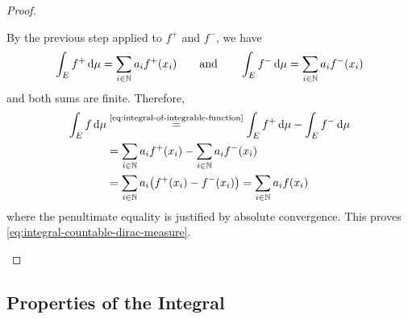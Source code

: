 \begin{proof}
\begin{itemize}[leftmargin=2.0em, labelsep=.5em]
By the previous step applied to $f^+$ and $f^-$, we have
\[
\int_E f^+\,\mathrm{d}\mu
=
\sum_{i\in\mathbb{N}} a_i f^+(x_i)
\qquad
\text{and}
\qquad
\int_E f^-\,\mathrm{d}\mu
=
\sum_{i\in\mathbb{N}} a_i f^-(x_i)
\]
and both sums are finite. Therefore,
\[
\begin{aligned}
\int_E f\,\mathrm{d}\mu
&\overset{\text{\eqref{eq:integral-of-integrable-function}}}{=}
\int_E f^+\,\mathrm{d}\mu
-
\int_E f^-\,\mathrm{d}\mu
\\
&=
\sum_{i\in\mathbb{N}} a_i f^+(x_i)
-
\sum_{i\in\mathbb{N}} a_i f^-(x_i)
\\
&=
\sum_{i\in\mathbb{N}} a_i\bigl(f^+(x_i)-f^-(x_i)\bigr) 
=
\sum_{i\in\mathbb{N}} a_i f(x_i)
\end{aligned}
\]
where the penultimate equality is justified by absolute convergence.
This proves \eqref{eq:integral-countable-dirac-measure}.
\qedhere
\end{itemize}
\end{proof}

\pagebreak[3]



\subsection{Properties of the Integral}


